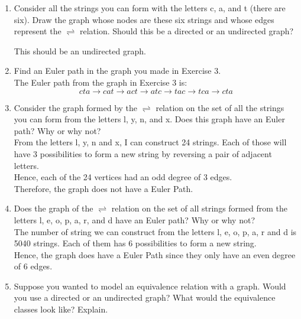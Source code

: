 \documentclass[12pt]{article}
\begin{document}
\begin{enumerate}
  \item Consider all the strings you can form with the letters c, a, and t (there are six). Draw the graph whose nodes are these six strings and whose edges represent the $\rightleftharpoons$ relation. Should this be a directed or an undirected graph?
  \begin{center}
  \end{center}
  This should be an undirected graph.
  \item Find an Euler path in the graph you made in Exercise 3.\\
  The Euler path from the graph in Exercise 3 is: 
  \[cta \rightarrow cat \rightarrow act \rightarrow atc \rightarrow tac \rightarrow tca \rightarrow cta\]
  \item Consider the graph formed by the $\rightleftharpoons$ relation on the set of all the strings you can form from the letters l, y, n, and x. Does this graph have an Euler path? Why or why not?\\
  From the letters l, y, n and x, I can construct 24 strings. Each of those will have 3 possibilities to form a new string by reversing a pair of adjacent letters. \\
  Hence, each of the 24 vertices had an odd degree of 3 edges.\\
  Therefore, the graph does not have a Euler Path.
  \item Does the graph of the $\rightleftharpoons$ relation on the set of all strings formed from the letters l, e, o, p, a, r, and d have an Euler path? Why or why not?\\
  The number of string we can construct from the letters l, e, o, p, a, r and d is 5040 strings. Each of them has 6 possibilities to form a new string.\\
  Hence, the graph does have a Euler Path since they only have an even degree of 6 edges.
  \item Suppose you wanted to model an equivalence relation with a graph. Would you use a directed or an undirected graph? What would the equivalence classes look like? Explain.\\

\end{enumerate}
\end{document}
